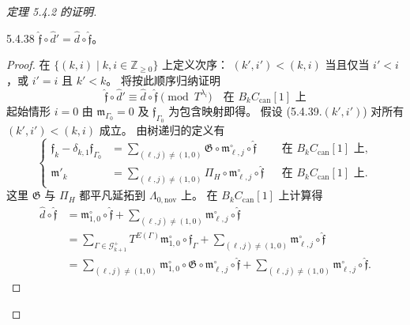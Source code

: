 \begin{proof}[定理 5.4.2 的证明]
\begin{lemma}{5.4.38}\label{lem:5-4-38}
$\widehat{\mathfrak f}\circ\widehat d'
=\widehat d\circ\widehat{\mathfrak f}$。
\end{lemma}
\begin{proof}
在 $\{(k,i)\mid k,i\in\mathbb Z_{\geq0}\}$
上定义次序：
$(k',i')<(k,i)$ 当且仅当
$i'<i$，或 $i'=i$ 且 $k'<k$。
将按此顺序归纳证明
\begin{equation}
\widehat{\mathfrak f}\circ\widehat d'
\equiv\widehat d\circ\widehat{\mathfrak f}
\pmod{T^{\lambda_i}}
\quad\text{在 }B_kC_{\mathrm{can}}[1]\text{ 上}
\tag{5.4.39.$(k,i)$}\label{eq:5-4-39}
\end{equation}
起始情形 $i=0$ 由
$\mathfrak m_{\Gamma_0}=0$
及 $\mathfrak f_{\Gamma_0}$ 为包含映射即得。
假设 (5.4.39.$(k',i')$)
对所有 $(k',i')<(k,i)$ 成立。
由树递归的定义有
\begin{equation}
\left\{\begin{aligned}
\mathfrak f_k-\delta_{k,1}\mathfrak f_{\Gamma_0}
&=\sum_{(\ell,j)\ne(1,0)}
\mathfrak G\circ\mathfrak m^\circ_{\ell,j}
\circ\widehat{\mathfrak f}
&&\text{在 }B_kC_{\mathrm{can}}[1]\text{ 上},\\
\mathfrak m'_k
&=\sum_{(\ell,j)\ne(1,0)}
\Pi_H\circ\mathfrak m^\circ_{\ell,j}
\circ\widehat{\mathfrak f}
&&\text{在 }B_kC_{\mathrm{can}}[1]\text{ 上}.
\end{aligned}\right.
\tag{5.4.40}\label{eq:5-4-40}
\end{equation}
这里 $\mathfrak G$ 与 $\Pi_H$
都平凡延拓到 $\Lambda_{0,\mathrm{nov}}$ 上。
在 $B_kC_{\mathrm{can}}[1]$ 上计算得
\begin{equation}
\begin{aligned}
\widehat d\circ\widehat{\mathfrak f}
&=\mathfrak m^\circ_{1,0}\circ\widehat{\mathfrak f}
 +\sum_{(\ell,j)\ne(1,0)}
 \mathfrak m^\circ_{\ell,j}\circ\widehat{\mathfrak f}\\
&=\sum_{\Gamma\in\mathcal G_{k+1}^+}
T^{E(\Gamma)}\mathfrak m^\circ_{1,0}
\circ\mathfrak f_\Gamma
 +\sum_{(\ell,j)\ne(1,0)}
\mathfrak m^\circ_{\ell,j}\circ\widehat{\mathfrak f}\\
&=\sum_{(\ell,j)\ne(1,0)}
\mathfrak m^\circ_{1,0}\circ\mathfrak G
\circ\mathfrak m^\circ_{\ell,j}
\circ\widehat{\mathfrak f}
 +\sum_{(\ell,j)\ne(1,0)}
\mathfrak m^\circ_{\ell,j}\circ\widehat{\mathfrak f}.
\end{aligned}
\tag{5.4.41}\label{eq:5-4-41}
\end{equation}

\end{proof}
\end{proof}
